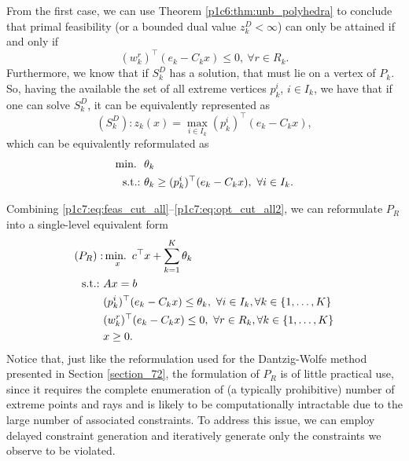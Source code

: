 From the first case, we can use Theorem \ref{p1c6:thm:unb_polyhedra} to conclude that primal feasibility (or a bounded dual value $z^D_k < \infty$) can only be attained if and only if
%
\begin{equation}
	(w^r_k)^\top (e_k - C_k x) \leq 0, \ \forall r \in R_k. \label{p1c7:eq:feas_cut_all}	
\end{equation}
%
Furthermore, we know that if $S^D_k$ has a solution, that must lie on a vertex of $P_k$. So, having the available the set of all extreme vertices $p_k^i$, $i \in I_k$, we have that if one can solve $S^D_k$, it can be equivalently represented as
%
\begin{equation*}
	(S^D_k) : z_k(x) = \max_{i \in I_k} (p^i_k)^\top (e_k - C_k x),
\end{equation*}   
%
which can be equivalently reformulated as
\begin{align}
	\mathop{\text{min.~}} \ & \theta_k \label{p1c7:eq:opt_cut_all1} \\
	\mathop{\text{s.t.:~}} & \theta_k \geq (p^i_k)^\top (e_k - C_k x), \ \forall i \in I_k. \label{p1c7:eq:opt_cut_all2}
\end{align}

Combining \eqref{p1c7:eq:feas_cut_all}--\eqref{p1c7:eq:opt_cut_all2}, we can reformulate $P_R$ into a single-level equivalent form 
%
\begin{align}
	(P_R) : & \mathop{\text{min.~}}_x c^\top x + \sum_{k=1}^K\theta_k \nonumber\\
	\mathop{\text{s.t.:~}}   & Ax = b \nonumber \\
		  & (p^i_k)^\top (e_k - C_k x) \leq  \theta_k, \ \forall i \in I_k, \forall k \in \left\{ 1,\dots, K \right \}  \label{p1c7:eq:opt_cut} \\
		  & 	(w^r_k)^\top (e_k - C_k x) \leq 0, \ \forall r \in R_k, \forall k \in \left\{ 1, \dots, K \right \} \label{p1c7:eq:feas_cut} \\
	      & x \geq 0. \nonumber
\end{align}
%
Notice that, just like the reformulation used for the Dantzig-Wolfe method presented in Section \ref{section_72}, the formulation of $P_R$ is of little practical use, since it requires the complete enumeration of (a typically prohibitive) number of extreme points and rays and is likely to be computationally intractable due to the large number of associated constraints. To address this issue, we can employ delayed constraint generation and iteratively generate only the constraints we observe to be violated. 

